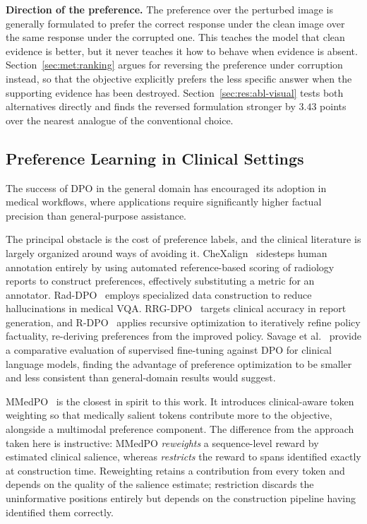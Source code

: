 \textbf{Direction of the preference.} The preference over the perturbed image is generally formulated to prefer the correct response under the clean image over the same response under the corrupted one. This teaches the model that clean evidence is better, but it never teaches it how to behave when evidence is absent. Section~\ref{sec:met:ranking} argues for reversing the preference under corruption instead, so that the objective explicitly prefers the less specific answer when the supporting evidence has been destroyed. Section~\ref{sec:res:abl-visual} tests both alternatives directly and finds the reversed formulation stronger by $3.43$ points over the nearest analogue of the conventional choice.

\subsection{Preference Learning in Clinical Settings}
\label{sec:rel:clinical}

The success of DPO in the general domain has encouraged its adoption in medical workflows, where applications require significantly higher factual precision than general-purpose assistance.

The principal obstacle is the cost of preference labels, and the clinical literature is largely organized around ways of avoiding it. CheXalign~\cite{hein2025chexalign, hein-etal-2025-chexalign} sidesteps human annotation entirely by using automated reference-based scoring of radiology reports to construct preferences, effectively substituting a metric for an annotator. Rad-DPO~\cite{puli2024raddpo} employs specialized data construction to reduce hallucinations in medical VQA. RRG-DPO~\cite{liu2025rrg} targets clinical accuracy in report generation, and R-DPO~\cite{liu2025rdpo} applies recursive optimization to iteratively refine policy factuality, re-deriving preferences from the improved policy. Savage et al.~\cite{savage2025fine} provide a comparative evaluation of supervised fine-tuning against DPO for clinical language models, finding the advantage of preference optimization to be smaller and less consistent than general-domain results would suggest.

MMedPO~\cite{zhu2024mmedpo} is the closest in spirit to this work. It introduces clinical-aware token weighting so that medically salient tokens contribute more to the objective, alongside a multimodal preference component. The difference from the approach taken here is instructive: MMedPO \emph{reweights} a sequence-level reward by estimated clinical salience, whereas \ourloss{} \emph{restricts} the reward to spans identified exactly at construction time. Reweighting retains a contribution from every token and depends on the quality of the salience estimate; restriction discards the uninformative positions entirely but depends on the construction pipeline having identified them correctly.

